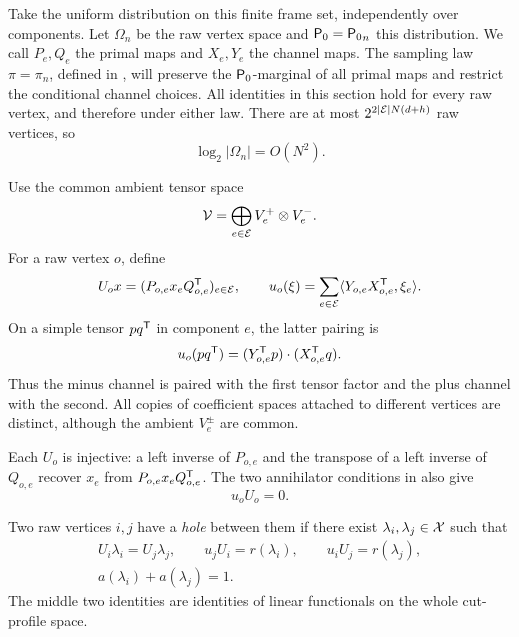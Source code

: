 Take the uniform distribution on this finite frame set, independently over components.
Let \(\Omega_n\) be the raw vertex space and \({\mathsf P_0}={\mathsf P_0}_n\) this distribution.
We call \(P_e,Q_e\) the primal maps and \(X_e,Y_e\) the channel maps.
The sampling law \(\pi=\pi_n\), defined in ,
will preserve the \({\mathsf P_0}\)-marginal of all primal maps and restrict
the conditional channel choices.  All identities in this section hold
for every raw vertex, and therefore under either law.
There are at most \(2^{2|\mathcal E|N(d+h)}\) raw vertices, so
\begin{equation}\label{eq:raw-space-size}
 \log_2|\Omega_n|=O(N^2).
\end{equation}

Use the common ambient tensor space
\[
 \mathcal V=\bigoplus_{e\in\mathcal E}V_e^+\otimes V_e^-.
\]
For a raw vertex \(o\), define
\begin{equation}\label{eq:raw-embedding}
 U_o x=(P_{o,e}x_eQ_{o,e}^{\mathsf T})_{e\in\mathcal E},
 \qquad
 u_o(\xi)=\sum_{e\in\mathcal E}\langle Y_{o,e}X_{o,e}^{\mathsf T},\xi_e\rangle.
\end{equation}
On a simple tensor \(pq^{\mathsf T}\) in component \(e\), the latter pairing is
\[
 u_o(pq^{\mathsf T})=(Y_{o,e}^{\mathsf T} p)\cdot(X_{o,e}^{\mathsf T} q).
\]
Thus the minus channel is paired with the first tensor factor and the plus channel with the second.
All copies of coefficient spaces attached to different vertices are distinct, although the ambient \(V_e^\pm\) are common.

Each \(U_o\) is injective: a left inverse of \(P_{o,e}\) and the transpose of a left inverse of \(Q_{o,e}\) recover \(x_e\) from \(P_{o,e}x_eQ_{o,e}^{\mathsf T}\).
The two annihilator conditions in  also give
\begin{equation}\label{eq:self-contraction-zero}
 u_oU_o=0.
\end{equation}

\begin{definition}\label{def:hole}
Two raw vertices \(i,j\) have a \emph{hole} between them if there exist \(\lambda_i,\lambda_j\in\mathcal X\) such that
\begin{equation}\label{eq:hole-equations}
 \begin{gathered}
 U_i\lambda_i=U_j\lambda_j,\qquad
 u_jU_i=r(\lambda_i),\qquad u_iU_j=r(\lambda_j),\\
 a(\lambda_i)+a(\lambda_j)=1.
 \end{gathered}
\end{equation}
The middle two identities are identities of linear functionals on the whole cut-profile space.
\end{definition}

